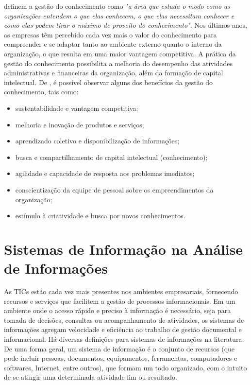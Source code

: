  \citet[p. 499 \textit{apud} Carvalho (2000)]{cardoso_machado2008} definem a gestão do conhecimento como \textit{"a área que estuda o modo como as organizações entendem o que elas conhecem, o que elas necessitam conhecer e como elas podem tirar o máximo de proveito do conhecimento"}. Nos últimos anos, as empresas têm percebido cada vez mais o valor do conhecimento para compreender e se adaptar tanto ao ambiente externo quanto o interno da organização, o que resulta em uma maior vantagem competitiva. A prática da gestão do conhecimento possibilita a melhoria do desempenho das atividades administrativas e financeiras da organização, além da formação de capital intelectual. De \citet{wada2012}, é possível observar alguns dos benefícios da gestão do conhecimento, tais como:
\begin{itemize}
	\item sustentabilidade e vantagem competitiva;
	\item melhoria e inovação de produtos e serviços;
	\item aprendizado coletivo e disponibilização de informações;
	\item busca e compartilhamento de capital intelectual (conhecimento);
	\item agilidade e capacidade de resposta aos problemas imediatos;
	\item conscientização da equipe de pessoal sobre os empreendimentos da organização;
	\item estímulo à criatividade e busca por novos conhecimentos.
\end{itemize} 


\section{Sistemas de Informação na Análise de Informações} \label{42}

As TICs estão cada vez mais presentes nos ambientes empresariais, fornecendo recursos e serviços que facilitem a gestão de processos informacionais. Em um ambiente onde o acesso rápido e preciso à informação é necessário, seja para tomada de decisões, consultas ou acompanhamento de atividades, os sistemas de informações agregam velocidade e eficiência ao trabalho de gestão documental e informacional. Há diversas definições para sistemas de informações na literatura. De uma forma geral, um sistema de informação é o conjunto de recursos (que pode incluir pessoas, documentos, equipamentos, ferramentas, computadores e softwares, Internet, entre outros), que formam um todo organizado, com o intuito de se atingir uma determinada atividade-fim ou resultado.

